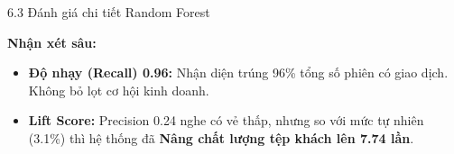\documentclass[aspectratio=169, 11pt]{beamer}
\begin{document}
\begin{frame}{6.3 Đánh giá chi tiết Random Forest}
    \begin{table}[H]
        \centering
        \caption{Báo cáo kết quả phân loại (Random Forest)}
    \end{table}
    
    \textbf{Nhận xét sâu:}
    \begin{itemize}
        \item \textbf{Độ nhạy (Recall) 0.96:} Nhận diện trúng 96\% tổng số phiên có giao dịch. Không bỏ lọt cơ hội kinh doanh.
        \item \textbf{Lift Score:} Precision 0.24 nghe có vẻ thấp, nhưng so với mức tự nhiên (3.1\%) thì hệ thống đã \textbf{Nâng chất lượng tệp khách lên 7.74 lần}.
    \end{itemize}
\end{frame}
\end{document}
